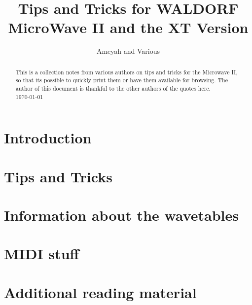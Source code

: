 \documentclass[]{article}
\title{Tips and Tricks for WALDORF MicroWave II and the XT Version}
\author{Ameyah and Various}
\begin{document}
\maketitle

\begin{abstract}
	\noindent
	This is a collection notes from various authors on tips and tricks for the Microwave II, so that its possible to quickly print them or have them available for browsing. The author of this document is thankful to the other authors of the quotes here.\\
	\today
\end{abstract}

\section{Introduction}

\section{Tips and Tricks}

\section{Information about the wavetables}

\section{MIDI stuff}

\section{Additional reading material}

\end{document}
